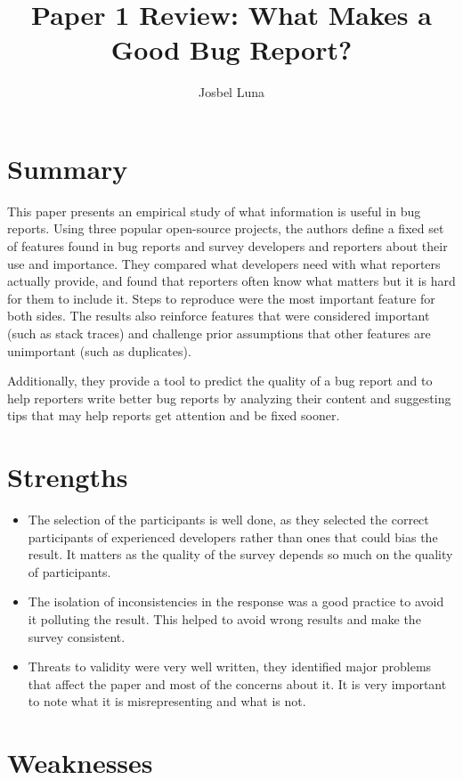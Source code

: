 \documentclass[11pt]{article}
\title{Paper 1 Review: What Makes a Good Bug Report?}
\author{Josbel Luna}
\date{}
\begin{document}
\maketitle

\section{Summary}

This paper presents an empirical study of what information is useful in bug reports.
Using three popular open-source projects, the authors define a fixed set of features found in bug reports and survey developers and reporters about their use and importance.
They compared what developers need with what reporters actually provide, and found that reporters often know what matters but it is hard for them to include it. Steps to reproduce were the most important feature for both sides.
The results also reinforce features that were considered important (such as stack traces) and challenge prior assumptions that other features are unimportant (such as duplicates).

Additionally, they provide a tool to predict the quality of a bug report and to help reporters write better bug reports by analyzing their content and suggesting tips that may help reports get attention and be fixed sooner.

\section{Strengths}

\begin{itemize}
  \item The selection of the participants is well done, as they selected the correct participants of experienced developers rather than ones that could bias the result. It matters as the quality of the survey depends so much on the quality of participants.
  \item The isolation of inconsistencies in the response was a good practice to avoid it polluting the result. This helped to avoid wrong results and make the survey consistent.
  \item Threats to validity were very well written, they identified major problems that affect the paper and most of the concerns about it. It is very important to note what it is misrepresenting and what is not.
\end{itemize}

\section{Weaknesses}
\end{document}
